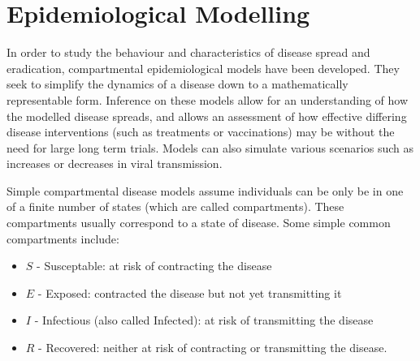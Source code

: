 \chapter{Epidemiological Modelling}

In order to study the behaviour and characteristics of disease spread and
eradication, compartmental epidemiological models have been developed. They
seek to simplify the dynamics of a disease down to a mathematically
representable form. Inference on these models allow for an understanding of how
the modelled disease spreads, and allows an assessment of how effective
differing disease interventions (such as treatments or vaccinations) may be
without the need for large long term trials. Models can also simulate various
scenarios such as increases or decreases in viral transmission.

Simple compartmental disease models assume individuals can be only be in one of
a finite number of states (which are called compartments). These compartments
usually correspond to a state of disease. Some simple common compartments
include: \begin{itemize}
    \item $S$ - Susceptable: at risk of contracting the disease
    \item $E$ - Exposed: contracted the disease but not yet transmitting it
    \item $I$ - Infectious (also called Infected): at risk of transmitting the
          disease
    \item $R$ - Recovered: neither at risk of contracting or transmitting the
          disease.
\end{itemize}

